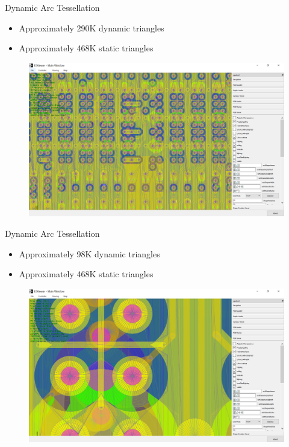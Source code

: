 \documentclass{beamer}
\begin{document}
\begin{frame}{Dynamic Arc Tessellation}
	\begin{itemize}
		\item Approximately 290K dynamic triangles
		\item Approximately 468K static triangles
	\end{itemize}
	\begin{figure}
		\centering
		\includegraphics[width=0.8\linewidth]{figures/cst2}
	\end{figure}
\end{frame}

\begin{frame}{Dynamic Arc Tessellation}
	\begin{itemize}
		\item Approximately 98K dynamic triangles
		\item Approximately 468K static triangles
	\end{itemize}
	\begin{figure}
		\centering
		\includegraphics[width=0.8\linewidth]{figures/cst3}
	\end{figure}
\end{frame}

\end{document}
